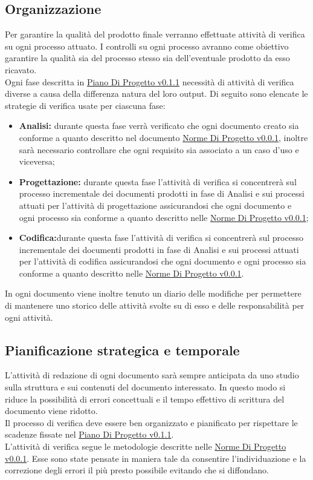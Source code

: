 \documentclass{scalatekids-article}
\begin{document}
\subsection{Organizzazione}
Per garantire la qualità del prodotto finale verranno effettuate attività di verifica su ogni processo attuato. I controlli su ogni processo avranno come obiettivo garantire la qualità sia del processo stesso sia dell'eventuale prodotto da esso ricavato.\\
Ogni fase descritta in \href{run:./PianoDiProgetto\_v0.1.1.pdf}{Piano Di Progetto v0.1.1} necessità di attività di verifica diverse a causa della differenza natura del loro output. Di seguito sono elencate le strategie di verifica usate per ciascuna fase:
\begin{itemize}
\item\textbf{Analisi:} durante questa fase verrà verificato che ogni documento creato sia conforme a quanto descritto nel documento \href{run:../Interni/NormeDiProgetto\_v0.0.1.pdf}{Norme Di Progetto v0.0.1}, inoltre sarà necessario controllare che ogni requisito sia associato a un caso d'uso e viceversa;
\item\textbf{Progettazione:} durante questa fase l'attività di verifica si concentrerà sul processo incrementale dei documenti prodotti in fase di Analisi e sui processi attuati per l'attività di progettazione assicurandosi che ogni documento e ogni processo sia conforme a quanto descritto nelle \href{run:../Interni/NormeDiProgetto\_v0.0.1.pdf}{Norme Di Progetto v0.0.1};
\item\textbf{Codifica:}durante questa fase l'attività di verifica si concentrerà sul processo incrementale dei documenti prodotti in fase di Analisi e sui processi attuati per l'attività di codifica assicurandosi che ogni documento e ogni processo sia conforme a quanto descritto nelle \href{run:../Interni/NormeDiProgetto\_v0.0.1.pdf}{Norme Di Progetto v0.0.1}.
\end{itemize}
In ogni documento viene inoltre tenuto un diario delle modifiche per permettere di mantenere uno storico delle attività svolte su di esso e delle responsabilità per ogni attività.
\subsection{Pianificazione strategica e temporale}
L'attività di redazione di ogni documento sarà sempre anticipata da uno studio sulla struttura e sui contenuti del documento interessato. In questo modo si riduce la possibilità di errori concettuali e il tempo effettivo di scrittura del documento viene ridotto.\\
Il processo di verifica deve essere ben organizzato e pianificato per rispettare le scadenze fissate nel \href{run:./PianoDiProgetto\_v0.1.1.pdf}{Piano Di Progetto v0.1.1}.\\
L'attività di verifica segue le metodologie descritte nelle \href{run:../Interni/NormeDiProgetto\_v0.0.1.pdf}{Norme Di Progetto v0.0.1}. Esse sono state pensate in maniera tale da consentire l'individuazione e la correzione degli errori il più presto possibile evitando che si diffondano.
\end{document}
